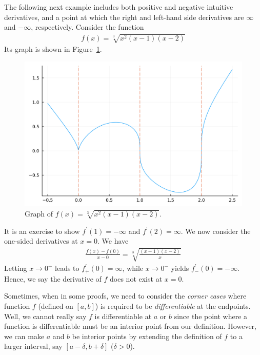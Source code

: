 \documentclass[thmcnt=section, 12pt]{my-elegantbook}
\begin{document}
\begin{example}
    The following next example includes both positive and negative intuitive derivatives, and a point at which the right and left-hand side derivatives are $\infty$ and $-\infty$, respectively. Consider the function 
    \begin{align*}
        f(x) = \sqrt[3]{x^2 (x-1) (x-2)}
    \end{align*}
    Its graph is shown in Figure~\ref{fig:3}.

    \begin{figure}[ht]
        \centering
        \includegraphics[scale=0.2]{figures/graph-003.png}
        \caption{Graph of $f(x) = \sqrt[3]{x^2 (x-1) (x-2)}$.}
        \label{fig:3}
    \end{figure}    

    It is an exercise to show $f^\prime(1) = -\infty$ and $f^\prime(2) = \infty$. We now consider the one-sided derivatives at $x = 0$. We have 
    \begin{align*}
        \frac{f(x) - f(0)}{x - 0}
        = \sqrt[3]{\frac{(x-1)(x-2)}{x}}
    \end{align*}
    Letting $x \to 0^{+}$ leads to $f^\prime_{+}(0) = \infty$, while $x \to 0^{-}$ yields $f^\prime_{-}(0) = -\infty$. Hence, we say the derivative of $f$ does not exist at $x = 0$.
    \label{eg:2}
\end{example}


Sometimes, when in some proofs,
we need to consider the \textit{corner cases}
where function $f$ (defined on $[a, b]$) 
is required to be \textit{differentiable}
at the endpoints.
Well, we cannot really say $f$ is differentiable
at $a$ or $b$ since
the point where a function is differentiable must
be an interior point from our definition.
However, we can make $a$ and $b$ be interior points
by extending the definition of $f$ to a larger
interval, say $[a-\delta, b+\delta]$ ($\delta > 0$).
\end{document}
